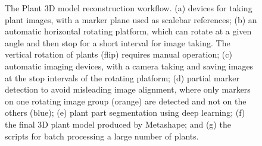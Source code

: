 \begin{figure}[htb]
  \begin{center}
  \end{center}
  \caption[The plant 3D model reconstruction workflow]{
    The Plant 3D model reconstruction workflow. (a) devices for taking plant images, with a marker plane used as scalebar references; (b) an automatic horizontal rotating platform, which can rotate at a given angle and then stop for a short interval for image taking. The vertical rotation of plants (flip) requires manual operation; (c) automatic imaging devices, with a camera taking and saving images at the stop intervals of the rotating platform; (d) partial marker detection to avoid misleading image alignment, where only markers on one rotating image group (orange) are detected and not on the others (blue); (e) plant part segmentation using deep learning; (f) the final 3D plant model produced by Metashape; and (g) the scripts for batch processing a large number of plants.
  }
  \label{fig:des_img_recons}
\end{figure}